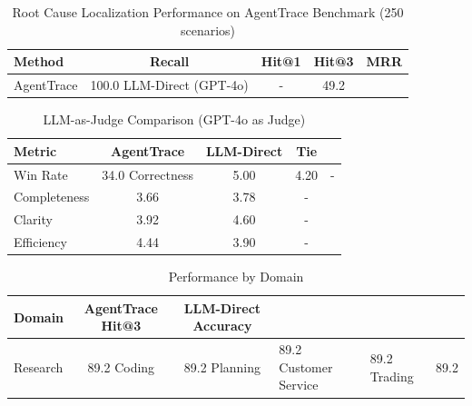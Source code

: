 
\begin{table}[t]
\centering
\caption{Root Cause Localization Performance on AgentTrace Benchmark (250 scenarios)}
\label{tab:main_results}
\begin{tabular}{lcccc}
\toprule
\textbf{Method} & \textbf{Recall} & \textbf{Hit@1} & \textbf{Hit@3} & \textbf{MRR} \\
\midrule
AgentTrace & 100.0%
LLM-Direct (GPT-4o) & - & 49.2%

\bottomrule
\end{tabular}
\end{table}



\begin{table}[t]
\centering
\caption{LLM-as-Judge Comparison (GPT-4o as Judge)}
\label{tab:judge_results}
\begin{tabular}{lccc}
\toprule
\textbf{Metric} & \textbf{AgentTrace} & \textbf{LLM-Direct} & \textbf{Tie} \\
\midrule
Win Rate & 34.0%
Correctness & 5.00 & 4.20 & - \\
Completeness & 3.66 & 3.78 & - \\
Clarity & 3.92 & 4.60 & - \\
Efficiency & 4.44 & 3.90 & - \\

\bottomrule
\end{tabular}
\end{table}



\begin{table}[t]
\centering
\caption{Performance by Domain}
\label{tab:domain_results}
\begin{tabular}{lcc}
\toprule
\textbf{Domain} & \textbf{AgentTrace Hit@3} & \textbf{LLM-Direct Accuracy} \\
\midrule
Research & 89.2%
Coding & 89.2%
Planning & 89.2%
Customer Service & 89.2%
Trading & 89.2%

\bottomrule
\end{tabular}
\end{table}
